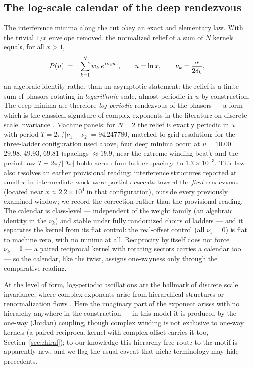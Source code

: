 \documentclass[11pt,a4paper]{article}
\begin{document}
\subsection{The log-scale calendar of the deep rendezvous}
\label{sec:calendar}

The interference minima along the cut obey an exact and elementary law.
With the trivial $1/x$ envelope removed, the normalized relief of a sum
of $N$ kernels equals, for all $x > 1$,
\begin{equation}
P(u) \;=\; \Bigl|\,\sum_{k=1}^{N} w_k\, e^{\,i\nu_k u}\Bigr|,
\qquad u = \ln x,\qquad \nu_k = \frac{\kappa}{2\delta_k},
\label{eq:phasors}
\end{equation}
an algebraic identity rather than an asymptotic statement: the relief is
a finite sum of phasors rotating in \emph{logarithmic} scale,
almost-periodic in $u$ by construction. The deep minima are therefore
\emph{log-periodic} rendezvous of the phasors --- a form which is the
classical signature of complex exponents in the literature on discrete
scale invariance \cite{Derrida1984,Sornette1998}. Machine panels: for
$N = 2$ the relief is exactly periodic in $u$ with period
$T = 2\pi/|\nu_1 - \nu_2| = 94.247780$, matched to grid resolution; for
the three-ladder configuration used above, four deep minima occur at
$u = 10.00$, $29.98$, $49.93$, $69.81$ (spacings $\approx 19.9$, near
the extreme-winding beat), and the period law $T = 2\pi/|\Delta\nu|$
holds across four ladder spacings to $1.3\times10^{-3}$. This law also
resolves an earlier provisional reading: interference structures
reported at small $x$ in intermediate work were partial descents toward
the \emph{first} rendezvous (located near $x \approx 2.2\times10^{4}$ in
that configuration), outside every previously examined window; we record
the correction rather than the provisional reading. The calendar is
class-level --- independent of the weight family (an algebraic identity
in the $\nu_k$) and stable under fully randomized choirs of ladders ---
and it separates the kernel from its flat control: the real-offset control
(all $\nu_k = 0$) is flat to machine zero, with no minima at all.
Reciprocity by itself does not force $\nu_k = 0$ --- a paired reciprocal
kernel with rotating sectors carries a calendar too --- so the calendar,
like the twist, assigns one-wayness only through the comparative reading.

At the level of form, log-periodic oscillations are the hallmark of
discrete scale invariance, where complex exponents arise from
hierarchical structures or renormalization flows
\cite{Sornette1998,Derrida1984}. Here the imaginary part of the exponent
arises with no hierarchy anywhere in the construction --- in this model it
is produced by the one-way (Jordan) coupling, though complex winding is not
exclusive to one-way kernels (a paired reciprocal kernel with complex offset
carries it too, Section~\ref{sec:chiral}); to our knowledge this
hierarchy-free route to the motif is apparently new, and we flag the usual
caveat that niche terminology may hide precedents.
\end{document}
